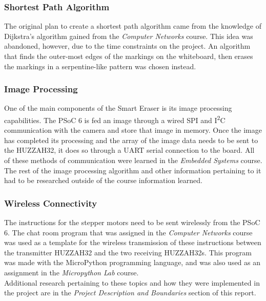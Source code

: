 \subsubsection{Shortest Path Algorithm}
The original plan to create a shortest path algorithm came from the knowledge of Dijkstra's algorithm gained from the \textit{Computer Networks} course. This idea was abandoned, however, due to the time constraints on the project. An algorithm that finds the outer-most edges of the markings on the whiteboard, then erases the markings in a serpentine-like pattern was chosen instead.\\

\subsubsection{Image Processing}
One of the main components of the Smart Eraser is its image processing capabilities. The PSoC 6 is fed an image through a wired SPI and I\textsuperscript{2}C communication with the camera and store that image in memory. Once the image has completed its processing and the array of the image data needs to be sent to the HUZZAH32, it does so through a UART serial connection to the board. All of these methods of communication were learned in the \textit{Embedded Systems} course. The rest of the image processing algorithm and other information pertaining to it had to be researched outside of the course information learned.\\

\subsubsection{Wireless Connectivity}
The instructions for the stepper motors need to be sent wirelessly from the PSoC 6. The chat room program that was assigned in the \textit{Computer Networks} course was used as a template for the wireless transmission of these instructions between the transmitter HUZZAH32 and the two receiving HUZZAH32s. This program was made with the MicroPython programming language, and was also used as an assignment in the \textit{Micropython Lab} course.\\

Additional research pertaining to these topics and how they were implemented in the project are in the \textit{Project Description and Boundaries} section of this report.   


